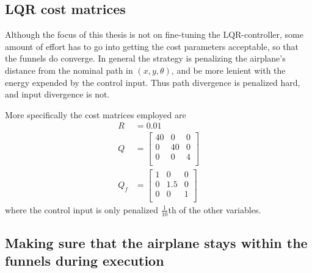 \subsection{LQR cost matrices}
\label{subsec:lqr-cost}

Although the focus of this thesis is not on fine-tuning the \ac{LQR}-controller,
some amount of effort has to go into getting the cost parameters acceptable, so
that the funnels do converge. In general the strategy is penalizing the
airplane's distance from the nominal path in \((x,y,\theta)\), and be more
lenient with the energy expended by the control input. Thus path divergence is
penalized hard, and input divergence is not.

More specifically the cost matrices employed are
\begin{align*}
  R &= 0.01 \\
  Q &= \begin{bmatrix}
    40 & 0 & 0  \\
    0 & 40 & 0  \\
    0 & 0 & 4   \\
  \end{bmatrix}
  \\
  Q_{f} &=
          \begin{bmatrix}
            1 & 0 & 0   \\
            0 & 1.5 & 0  \\
            0 & 0 & 1   \\
          \end{bmatrix}
\end{align*}
where the control input is only penalized \(\frac{1}{10}\)th of the other
variables.

\subsection{Making sure that the airplane stays within the funnels during
  execution}
\label{subsec:check-vehicle-in-funnel}

